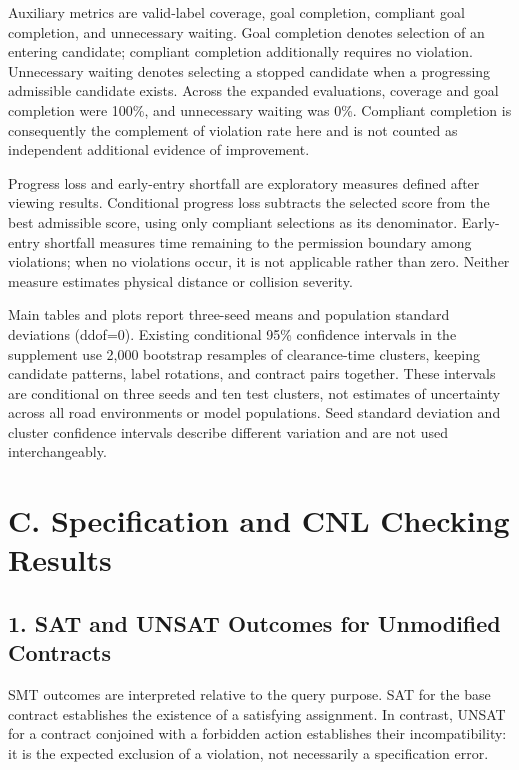 \documentclass[11pt,a4paper]{article}
\begin{document}
Auxiliary metrics are valid-label coverage, goal completion, compliant goal completion, and unnecessary waiting. Goal completion denotes selection of an entering candidate; compliant completion additionally requires no violation. Unnecessary waiting denotes selecting a stopped candidate when a progressing admissible candidate exists. Across the expanded evaluations, coverage and goal completion were 100\%, and unnecessary waiting was 0\%. Compliant completion is consequently the complement of violation rate here and is not counted as independent additional evidence of improvement.\par

Progress loss and early-entry shortfall are exploratory measures defined after viewing results. Conditional progress loss subtracts the selected score from the best admissible score, using only compliant selections as its denominator. Early-entry shortfall measures time remaining to the permission boundary among violations; when no violations occur, it is not applicable rather than zero. Neither measure estimates physical distance or collision severity.\par

Main tables and plots report three-seed means and population standard deviations (ddof=0). Existing conditional 95\% confidence intervals in the supplement use 2,000 bootstrap resamples of clearance-time clusters, keeping candidate patterns, label rotations, and contract pairs together. These intervals are conditional on three seeds and ten test clusters, not estimates of uncertainty across all road environments or model populations. Seed standard deviation and cluster confidence intervals describe different variation and are not used interchangeably.\par

\section*{C. Specification and CNL Checking Results}

\subsection*{1. SAT and UNSAT Outcomes for Unmodified Contracts}

SMT outcomes are interpreted relative to the query purpose. SAT for the base contract establishes the existence of a satisfying assignment. In contrast, UNSAT for a contract conjoined with a forbidden action establishes their incompatibility: it is the expected exclusion of a violation, not necessarily a specification error.\par
\end{document}
